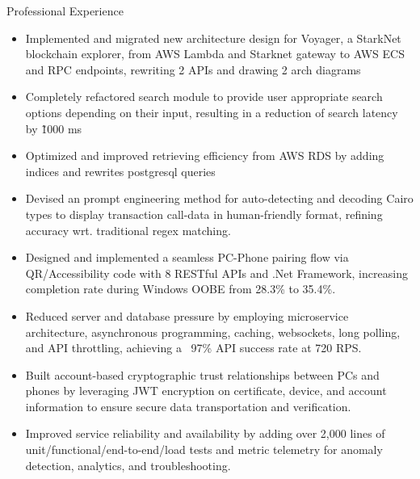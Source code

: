 \documentclass{resume} %
\begin{document}
\begin{workSection}{Professional Experience}
     \experienceItem[
        company=Nethermind,
        location=Remote,
        position=Internship Program @Ethereum Foundation,
        duration=Aug. 2023 -- Nov. 2023
    ]
     \vspace{-0.5em}
    \begin{itemize}
        \itemsep -6pt {} 
        \item Implemented and migrated new architecture design for Voyager, a StarkNet blockchain explorer, from AWS Lambda and Starknet gateway to AWS ECS and RPC endpoints, rewriting 2 APIs and drawing 2 arch diagrams
        \item Completely refactored search module to provide user appropriate search options depending on their input, resulting in a reduction of search latency by \~ 1000 ms
        \item Optimized and improved retrieving efficiency from AWS RDS by adding indices and rewrites postgresql queries
        \item Devised an prompt engineering method for auto-detecting and decoding Cairo types to display transaction call-data in human-friendly format, refining accuracy wrt. traditional regex matching.
     \end{itemize}
     
    \experienceItem[
        company=Microsoft,
        location=Suzhou{,} China,
        position=Software Engineer,
        duration=Jan. 2022 -- Aug. 2022
    ]
     \vspace{-0.5em}
     \begin{itemize}
        \itemsep -6pt {} 
        \item Designed and implemented a seamless PC-Phone pairing flow via QR/Accessibility code with 8 RESTful APIs and .Net Framework, increasing completion rate during Windows OOBE from 28.3\% to 35.4\%.
        \item Reduced server and database pressure by employing microservice architecture, asynchronous programming, caching, websockets, long polling, and API throttling, achieving a ~97\% API success rate at 720 RPS.
        \item Built account-based cryptographic trust relationships between PCs and phones by leveraging JWT encryption on certificate, device, and account information to ensure secure data transportation and verification.
        \item Improved service reliability and availability by adding over 2,000 lines of unit/functional/end-to-end/load tests and metric telemetry for anomaly detection, analytics, and troubleshooting.
     \end{itemize}
     

\end{workSection}
\end{document}
